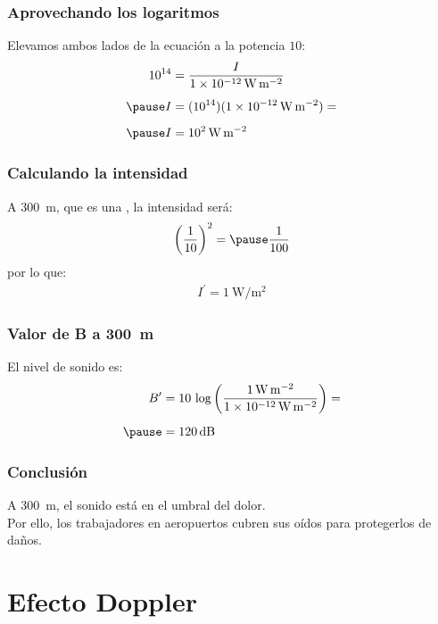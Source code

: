 \documentclass[14pt]{beamer}
\begin{document}
\begin{frame}
\frametitle{Aprovechando los logaritmos}
Elevamos ambos lados de la ecuación a la potencia $10$:
\pause
\begin{eqnarray*}
\begin{aligned}
10^{14} &= \dfrac{I}{\SI{1d-12}{\watt\per\square\meter}} \\[0.5em] \pause
I &= (10^{14})(\SI{1d-12}{\watt\per\square\meter}) = \\[0.5em] \pause
I &= \SI{d2}{\watt\per\square\meter}
\end{aligned}
\end{eqnarray*}
\end{frame}
\begin{frame}
\frametitle{Calculando la intensidad}
A \SI{300}{\meter}, que es una , \pause la intensidad será:
\pause
\begin{eqnarray*}
\begin{aligned}
\left( \dfrac{1}{10} \right)^{2} = \pause \dfrac{1}{100}
\end{aligned}
\end{eqnarray*}
\pause
por lo que:
\begin{align*}
I^{\prime} = \SI{1}{\watt\per\square\meter}
\end{align*}
\end{frame}
\begin{frame}
\frametitle{Valor de B a \SI{300}{m}}
El nivel de sonido es:
\pause
\begin{eqnarray*}
\begin{aligned}
B^{\prime} &= 10 \, \log \left( \dfrac{\SI{1}{\watt\per\square\meter}}{\SI{1d-12}{\watt\per\square\meter}} \right) = \\[0.5em] \pause
&= \SI{120}{\dB}
\end{aligned}
\end{eqnarray*}
\end{frame}
\begin{frame}
\frametitle{Conclusión}
A \SI{300}{\meter}, el sonido está en el umbral del dolor.
\\
\bigskip
\pause
Por ello, los trabajadores en aeropuertos cubren sus oídos para protegerlos de daños.
\end{frame}

\section{Efecto Doppler}
\end{document}

